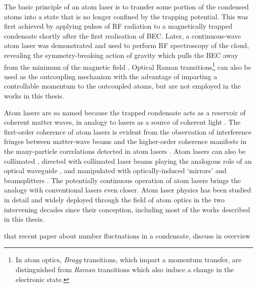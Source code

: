 
	The basic principle of an atom laser is to transfer some portion of the condensed atoms into a state that is no longer confined by the trapping potential.
	This was first achieved by applying pulses of RF radiation to a magnetically trapped condensate shortly after the first realisation of BEC\cite{mewes97}.
	Later, a continuous-wave atom laser was demonstrated and used to perform RF spectroscopy of the cloud, revealing the symmetry-breaking action of gravity which pulls the BEC away from the minimum of the magnetic field \cite{bloch99}.
	Optical Raman transitions\footnote{In atom optics, \emph{Bragg} transitions, which impart a momentum transfer, are distinguished from  \emph{Raman} transitions which also induce a change in the electronic state.} can also be used as the outcoupling mechanism \cite{Hagley99} with the advantage of imparting a controllable momentum to the outcoupled atoms, but are not employed in the works in this thesis.
	

	Atom lasers are so named because the trapped condensate acts as a reservoir of coherent matter waves, in analogy to lasers as a source of coherent light \cite{narashewski,glauberXX}.
	The first-order coherence of atom lasers is evident from the observation of interference fringes between matter-wave beams \cite{andrews97} and the higher-order coherence manifests in the many-particle correlations detected in \mhe atom lasers \cite{SomeMorePapers}.
	Atom lasers can also be collimated \cite{bloch99}, directed with collimated laser beams playing the analogous role of an optical waveguide \cite{Guerin06,couvert08}, and manipulated with optically-induced `mirrors' and beamsplitters \cite{Bloch01}.
	The potentially continuous operation of atom lasers \cite{Chikkatur02} brings the analogy with conventional lasers even closer.
	Atom laser physics has been studied in detail and widely deployed through the field of atom optics in the two intervening decades since their conception, including most of the works described in this thesis.
	
	that recent paper about number fluctuations in a condensate, discuss in overview


